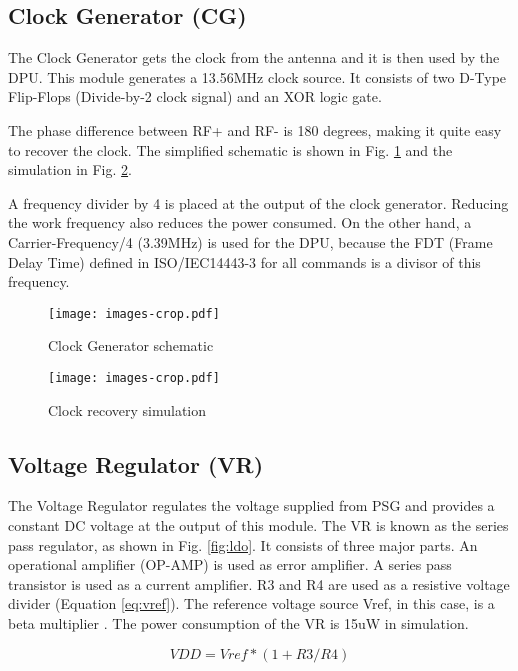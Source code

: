 \subsection{Clock Generator (CG)}

The Clock Generator gets the clock from the antenna and it is then used by the DPU. This module generates a 13.56MHz clock source. It consists of two D-Type Flip-Flops (Divide-by-2 clock signal) and an XOR logic gate. 

The phase difference between RF+ and RF- is 180 degrees, making it quite easy to recover the clock. The simplified schematic is shown in Fig. \ref{fig:clk} and the simulation in Fig. \ref{fig:clk_sim}.

A frequency divider by 4 is placed at the output of the clock generator. Reducing the work frequency also reduces the power consumed. On the other hand, a Carrier-Frequency/4 (3.39MHz) is used for the DPU, because the FDT (Frame Delay Time) defined in ISO/IEC14443-3 for all commands is a divisor of this frequency.
 

\begin{figure}[]
  \centering
  \texttt{[image: images-crop.pdf]}
  \caption{Clock Generator schematic}
  \label{fig:clk}
\end{figure}

\begin{figure}[h]
  \centering
  \texttt{[image: images-crop.pdf]}
  \caption{Clock recovery simulation}
  \label{fig:clk_sim}
\end{figure}


\subsection{Voltage Regulator (VR)}

The Voltage Regulator \cite{rfid_ldo} regulates the voltage supplied from PSG and provides a constant DC voltage at the output of this module. The VR is known as the series pass regulator, as shown in Fig. \ref{fig:ldo}. It consists of three major parts. An operational amplifier (OP-AMP) is used as error amplifier. A series pass transistor is used as a current amplifier. R3 and R4 are used as a resistive voltage divider (Equation \ref{eq:vref}). The reference voltage source Vref, in this case, is a beta multiplier \cite{panadero}. The power consumption of the VR is 15uW in simulation. 

\begin{equation} \label{eq:vref}
VDD = Vref*(1+R3/R4)
\end{equation}


